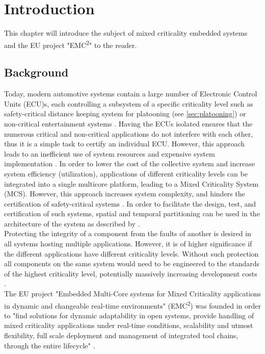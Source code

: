 \chapter{Introduction}
\label{sec:introduction}
This chapter will introduce the subject of mixed criticality embedded systems and the EU project "EMC\textsuperscript{2}" to the reader.

\section{Background}
Today, modern automotive systems contain a large number of Electronic Control Units (ECU)s, each controlling a subsystem of a specific criticality level such as safety-critical distance keeping system for platooning (see \ref{sec:platooning}) or non-critical entertainment systems \cite{website:emc2automotive}. Having the ECUs isolated ensures that the numerous critical and non-critical applications do not interfere with each other, thus it is a simple task to certify an individual ECU. However, this approach leads to an inefficient use of system resources and expensive system implementation \cite{burns2016}. In order to lower the cost of the collective system and increase system efficiency (utilization), applications of different criticality levels can be integrated into a single multicore platform, leading to a Mixed Criticality System (MCS). However, this approach increases system complexity, and hinders the certification of safety-critical systems \cite{zaki2016}. 
In order to facilitate the design, test, and certification of such systems, spatial and temporal partitioning can be used in the architecture of the system as described by \cite{zaki2016}.\\

Protecting the integrity of a component from the faults of another is desired in all systems hosting multiple applications. However, it is of higher significance if the different applications have different criticality levels. Without such protection all components on the same system would need to be engineered to the standards of the highest criticality level, potentially massively increasing development costs \cite{burns2016}.\\

The EU project "Embedded Multi-Core systems for Mixed Criticality applications in dynamic and changeable real-time environments" (EMC\textsuperscript{2}) was founded in order to "find solutions for dynamic adaptability in open systems, provide handling of mixed criticality applications under real-time conditions, scalability and utmost flexibility, full scale deployment and management of integrated tool chains, through the entire lifecycle" \cite{website:emc2}. 

